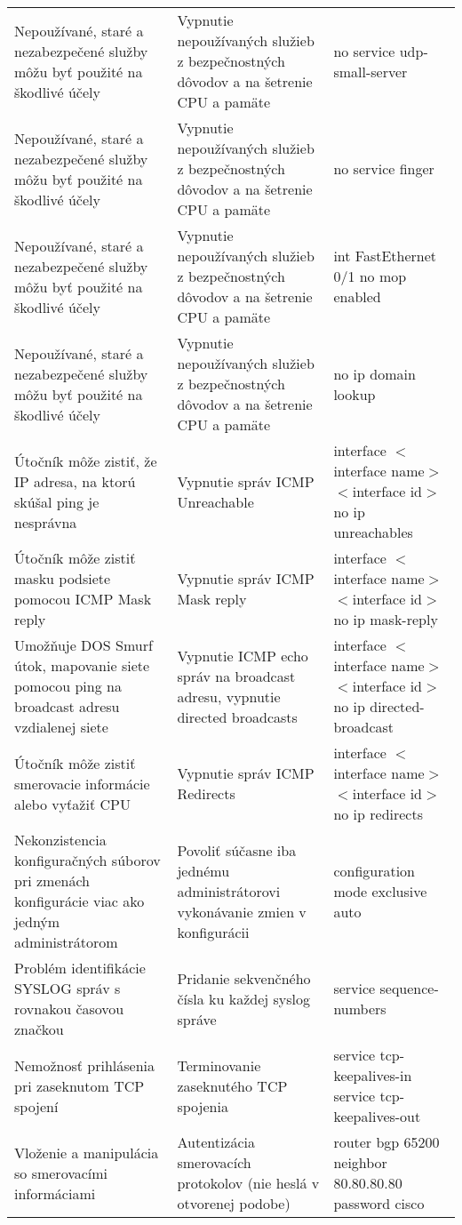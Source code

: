 \begin{longtable}[!htbp]{|L{10em}L{10em}L{34em}|}
	Nepoužívané, staré a nezabezpečené služby môžu byť použité na škodlivé účely	&Vypnutie nepoužívaných služieb z bezpečnostných dôvodov a na šetrenie CPU a pamäte 	&no service udp-small-server\\
	Nepoužívané, staré a nezabezpečené služby môžu byť použité na škodlivé účely	&Vypnutie nepoužívaných služieb z bezpečnostných dôvodov a na šetrenie CPU a pamäte 	&no service finger\\
	Nepoužívané, staré a nezabezpečené služby môžu byť použité na škodlivé účely	&Vypnutie nepoužívaných služieb z bezpečnostných dôvodov a na šetrenie CPU a pamäte 	&int FastEthernet 0/1
	no mop enabled\\
	Nepoužívané, staré a nezabezpečené služby môžu byť použité na škodlivé účely	&Vypnutie nepoužívaných služieb z bezpečnostných dôvodov a na šetrenie CPU a pamäte 	&no ip domain lookup\\
	Útočník môže zistiť, že IP adresa, na ktorú skúšal ping je nesprávna	&Vypnutie správ ICMP Unreachable	&interface $<$interface name$>$ $<$interface id$>$
	no ip unreachables\\
	Útočník môže zistiť masku podsiete pomocou ICMP Mask reply	&Vypnutie správ ICMP Mask reply	&interface $<$interface name$>$ $<$interface id$>$
	no ip mask-reply\\
	Umožňuje DOS Smurf útok, mapovanie siete pomocou ping na broadcast adresu vzdialenej siete	&Vypnutie ICMP echo správ na broadcast adresu, vypnutie directed broadcasts	&interface $<$interface name$>$ $<$interface id$>$
	no ip directed-broadcast\\
	Útočník môže zistiť smerovacie informácie alebo vyťažiť CPU	&Vypnutie správ ICMP Redirects	&interface $<$interface name$>$ $<$interface id$>$
	no ip redirects\\
	Nekonzistencia konfiguračných súborov pri zmenách konfigurácie viac ako jedným administrátorom	&Povoliť súčasne iba jednému administrátorovi vykonávanie zmien v konfigurácii	&configuration mode exclusive auto\\
	Problém identifikácie SYSLOG správ s rovnakou časovou značkou	&Pridanie sekvenčného čísla ku každej syslog správe	&service sequence-numbers\\
	Nemožnosť prihlásenia pri zaseknutom TCP spojení	&Terminovanie zaseknutého TCP spojenia	&service tcp-keepalives-in
	service tcp-keepalives-out\\
	Vloženie a manipulácia so smerovacími informáciami	&Autentizácia smerovacích protokolov (nie heslá v otvorenej podobe)	&router bgp 65200
	neighbor 80.80.80.80 password cisco   \\

\end{longtable}
